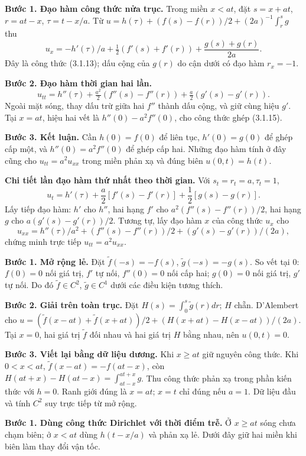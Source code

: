 \textbf{Bước 1. Đạo hàm công thức nửa trục.} Trong miền $x<at$, đặt $s=x+at$, $r=at-x$, $\tau=t-x/a$. Từ $u=h(\tau)+(f(s)-f(r))/2+(2a)^{-1}\int_r^s g$ thu
\[u_x=-h'(\tau)/a+\tfrac12(f'(s)+f'(r))+\frac{g(s)+g(r)}{2a}.\]
Đây là công thức (3.1.13); dấu cộng của $g(r)$ do cận dưới có đạo hàm $r_x=-1$.

\textbf{Bước 2. Đạo hàm thời gian hai lần.}
\[u_{tt}=h''(\tau)+\tfrac{a^2}2(f''(s)-f''(r))+\tfrac a2(g'(s)-g'(r)).\]
Ngoài mặt sóng, thay dấu trừ giữa hai $f''$ thành dấu cộng, và giữ cùng hiệu $g'$. Tại $x=at$, hiệu hai vết là $h''(0)-a^2f''(0)$, cho công thức ghép (3.1.15).

\textbf{Bước 3. Kết luận.} Cần $h(0)=f(0)$ để liên tục, $h'(0)=g(0)$ để ghép cấp một, và $h''(0)=a^2f''(0)$ để ghép cấp hai. Những đạo hàm tính ở đây cũng cho $u_{tt}=a^2u_{xx}$ trong miền phản xạ và đúng biên $u(0,t)=h(t)$.

\textbf{Chi tiết lần đạo hàm thứ nhất theo thời gian.} Với $s_t=r_t=a,\tau_t=1$,
\[u_t=h'(\tau)+\frac a2[f'(s)-f'(r)]+\frac12[g(s)-g(r)].\]
Lấy tiếp đạo hàm: $h'$ cho $h''$, hai hạng $f'$ cho $a^2(f''(s)-f''(r))/2$, hai hạng $g$ cho $a(g'(s)-g'(r))/2$. Tương tự, lấy đạo hàm $x$ của công thức $u_x$ cho
\[u_{xx}=h''(\tau)/a^2+(f''(s)-f''(r))/2+(g'(s)-g'(r))/(2a),\]
chứng minh trực tiếp $u_{tt}=a^2u_{xx}$.

\textbf{Bước 1. Mở rộng lẻ.} Đặt $\widetilde f(-s)=-f(s)$, $\widetilde g(-s)=-g(s)$. So vết tại $0$: $f(0)=0$ nối giá trị, $f'$ tự nối, $f''(0)=0$ nối cấp hai; $g(0)=0$ nối giá trị, $g'$ tự nối. Do đó $\widetilde f\in C^2$, $\widetilde g\in C^1$ dưới các điều kiện tương thích.

\textbf{Bước 2. Giải trên toàn trục.} Đặt $H(s)=\int_0^s\widetilde g(r)dr$; $H$ chẵn. D'Alembert cho $u=(\widetilde f(x-at)+\widetilde f(x+at))/2+(H(x+at)-H(x-at))/(2a)$. Tại $x=0$, hai giá trị $\widetilde f$ đối nhau và hai giá trị $H$ bằng nhau, nên $u(0,t)=0$.

\textbf{Bước 3. Viết lại bằng dữ liệu dương.} Khi $x\ge at$ giữ nguyên công thức. Khi $0<x<at$, $\widetilde f(x-at)=-f(at-x)$, còn $H(at+x)-H(at-x)=\int_{at-x}^{at+x}g$. Thu công thức phản xạ trong phần kiến thức với $h=0$. Ranh giới đúng là $x=at$; $x=t$ chỉ đúng nếu $a=1$. Dữ liệu đầu và tính $C^2$ suy trực tiếp từ mở rộng.

\textbf{Bước 1. Dùng công thức Dirichlet với thời điểm trễ.} Ở $x\ge at$ sóng chưa chạm biên; ở $x<at$ dùng $h(t-x/a)$ và phản xạ lẻ. Dưới đây giữ hai miền khi biên làm thay đổi vận tốc.

